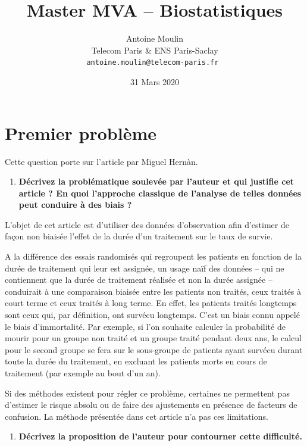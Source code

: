\documentclass[12pt, a4paper]{article}
\title{
Master MVA -- Biostatistiques
}
\author{
Antoine Moulin \\
Telecom Paris \& ENS Paris-Saclay \\
\tt antoine.moulin@telecom-paris.fr
}
\date{31 Mars 2020}
\begin{document}
\maketitle

\section{Premier problème}

Cette question porte sur l’article \cite{hernan18} par Miguel Hernàn.

\begin{enumerate}
    \item \textbf{Décrivez la problématique soulevée par l’auteur et qui justifie cet article ? En quoi l’approche classique de l’analyse de telles données peut conduire à des biais ?}
\end{enumerate}

    L'objet de cet article est d'utiliser des données d'observation afin d'estimer de façon non biaisée l'effet de la durée d'un traitement sur le taux de survie.
    
    A la différence des essais randomisés qui regroupent les patients en fonction de la durée de traitement qui leur est assignée, un usage naïf des données -- qui ne contiennent que la durée de traitement réalisée et non la durée assignée -- conduirait à une comparaison biaisée entre les patients non traités, ceux traités à court terme et ceux traités à long terme. En effet, les patients traités longtemps sont ceux qui, par définition, ont survécu longtemps. C'est un biais connu appelé le biais d'immortalité. Par exemple, si l'on souhaite calculer la probabilité de mourir pour un groupe non traité et un groupe traité pendant deux ans, le calcul pour le second groupe se fera sur le sous-groupe de patients ayant survécu durant toute la durée du traitement, en excluant les patients morts en cours de traitement (par exemple au bout d'un an).
    
    Si des méthodes existent pour régler ce problème, certaines ne permettent pas d'estimer le risque absolu ou de faire des ajustements en présence de facteurs de confusion. La méthode présentée dans cet article n'a pas ces limitations.

\pagebreak
\begin{enumerate}[resume]
    \item \textbf{Décrivez la proposition de l’auteur pour contourner cette difficulté.}
\end{enumerate}
\end{document}
